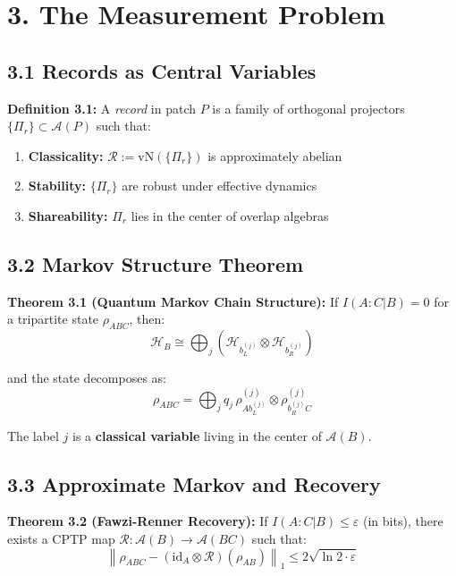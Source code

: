\section{3. The Measurement Problem}\label{3-the-measurement-problem}

\subsection{3.1 Records as Central Variables}\label{31-records-as-central-variables}

\textbf{Definition 3.1:} A \emph{record} in patch \(P\) is a family of orthogonal projectors \(\{\Pi_r\} \subset \mathcal{A}(P)\) such that:

\begin{enumerate}
\def\labelenumi{\arabic{enumi}.}
\tightlist
\item
  \textbf{Classicality:} \(\mathcal{R} := \text{vN}(\{\Pi_r\})\) is approximately abelian
\item
  \textbf{Stability:} \(\{\Pi_r\}\) are robust under effective dynamics
\item
  \textbf{Shareability:} \(\Pi_r\) lies in the center of overlap algebras
\end{enumerate}

\subsection{3.2 Markov Structure Theorem}\label{32-markov-structure-theorem}

\textbf{Theorem 3.1 (Quantum Markov Chain Structure):} If \(I(A:C|B) = 0\) for a tripartite state \(\rho_{ABC}\), then: \[\mathcal{H}_B \cong \bigoplus_j \left(\mathcal{H}_{b_L^{(j)}} \otimes \mathcal{H}_{b_R^{(j)}}\right)\]

and the state decomposes as: \[\rho_{ABC} = \bigoplus_j q_j \, \rho_{A b_L^{(j)}}^{(j)} \otimes \rho_{b_R^{(j)} C}^{(j)}\]

The label \(j\) is a \textbf{classical variable} living in the center of \(\mathcal{A}(B)\).

\subsection{3.3 Approximate Markov and Recovery}\label{33-approximate-markov-and-recovery}

\textbf{Theorem 3.2 (Fawzi-Renner Recovery):} If \(I(A:C|B) \leq \varepsilon\) (in bits), there exists a CPTP map \(\mathcal{R}: \mathcal{A}(B) \to \mathcal{A}(BC)\) such that: \[\left\|\rho_{ABC} - (\text{id}_A \otimes \mathcal{R})(\rho_{AB})\right\|_1 \leq 2\sqrt{\ln 2 \cdot \varepsilon}\]

